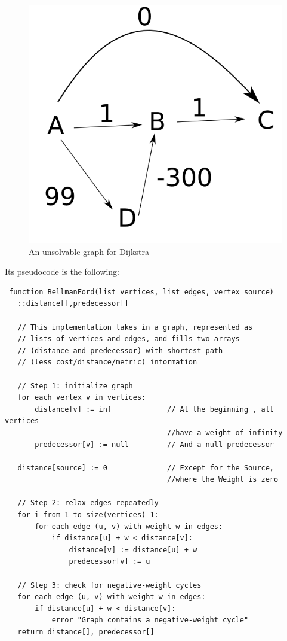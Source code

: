 \begin{figure}[!ht]
  \centering
  \includegraphics[scale=0.2]{images/rmowk.png} 
  \caption{An unsolvable graph for Dijkstra}
  \label{unsolvable}
\end{figure}

Its pseudocode is the following:

\begin{verbatim}
 function BellmanFord(list vertices, list edges, vertex source)
   ::distance[],predecessor[]

   // This implementation takes in a graph, represented as
   // lists of vertices and edges, and fills two arrays
   // (distance and predecessor) with shortest-path
   // (less cost/distance/metric) information

   // Step 1: initialize graph
   for each vertex v in vertices:
       distance[v] := inf             // At the beginning , all vertices 
                                      //have a weight of infinity
       predecessor[v] := null         // And a null predecessor
   
   distance[source] := 0              // Except for the Source, 
                                      //where the Weight is zero 
   
   // Step 2: relax edges repeatedly
   for i from 1 to size(vertices)-1:
       for each edge (u, v) with weight w in edges:
           if distance[u] + w < distance[v]:
               distance[v] := distance[u] + w
               predecessor[v] := u

   // Step 3: check for negative-weight cycles
   for each edge (u, v) with weight w in edges:
       if distance[u] + w < distance[v]:
           error "Graph contains a negative-weight cycle"
   return distance[], predecessor[]
\end{verbatim}

